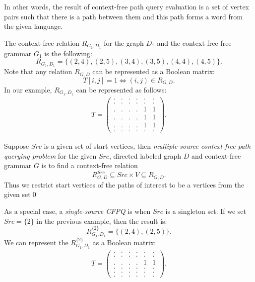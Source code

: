 In other words, the result of context-free path query evaluation is a set of vertex pairs such that there is a path between them and this path forms a word from the given language.

The context-free relation $R_{G_1,D_1}$ for the graph $D_1$ and the context-free free grammar $G_1$ is the following:
$$R_{G_1, D_1} = \{(2, 4), (2, 5), (3, 4), (3, 5), (4, 4), (4, 5)\}.$$
Note that any relation $R_{G, D}$ can be represented as a Boolean matrix: $$T[i,j] = 1 \iff (i,j) \in R_{G, D}.$$
In our example, $R_{G_1, D_1}$ can be represented as follows:
{
    \renewcommand{\arraystretch}{0.7}
    \setlength\arraycolsep{2pt}
\begin{align*}
T =
\begin{pmatrix}
    . & . & . & . & . & . \\
    . & . & . & . & . & . \\
    . & . & . & . & 1 & 1 \\
    . & . & . & . & 1 & 1 \\
    . & . & . & . & 1 & 1 \\
    . & . & . & . & . & .
\end{pmatrix}.
\end{align*}
}

\begin{definition}
    Suppose $Src$ is a given set of start vertices, then \textit{multiple-source context-free path querying problem} for the given $Src$, directed labeled graph $D$ and context-free grammar $G$ is to find a context-free relation
    $$R_{G, D}^{Src} \subseteq Src\times V \subseteq R_{G,D}.$$
    Thus we restrict start vertices of the paths of interest to be a vertices from the given set\qed
\end{definition}

As a special case, a \emph{single-source CFPQ} is when $Src$ is a singleton set.
If we set $Src=\{2\}$ in the previous example, then the result is: $$R_{G_1, D_1}^{\{2\}} = \{(2, 4), (2, 5)\}.$$
We can represent the $R_{G_1, D_1}^{\{2\}}$ as a Boolean matrix:
{
    \renewcommand{\arraystretch}{0.7}
    \setlength\arraycolsep{2pt}
\begin{align*}
T =
\begin{pmatrix}
    . & . & . & . & . & . \\
    . & . & . & . & . & . \\
    . & . & . & . & 1 & 1 \\
    . & . & . & . & . & . \\
    . & . & . & . & . & . \\
    . & . & . & . & . & .
\end{pmatrix}.
\end{align*}
}

